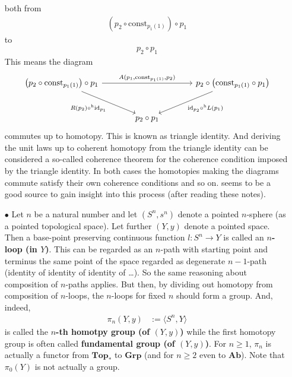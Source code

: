 \begin{enumerate}
both from
\begin{align*}
  \left(
    p_{2}
    \circ
    \mathrm{const}_{p_{1}(1)}
  \right)
  \circ
  p_{1}
\end{align*}
to
\begin{align*}
  p_{2}
  \circ
  p_{1}
\end{align*}
This means the diagram
\[
\begin{tikzcd}[sep=large]
  \left(
    p_{2}
    \circ
    \mathrm{const}_{p_{1}(1)}
  \right)
  \circ
  p_{1}
  \arrow{rr}{A(p_{1},\mathrm{const}_{p_{1}(1)},p_{2})}
  \arrow[swap]{dr}{R(p_{2}) \circ^{\textrm{h}} \mathrm{id}_{p_{1}}}
  &
  &
  p_{2}
  \circ
  \left(
    \mathrm{const}_{p_{1}(1)}
    \circ
    p_{1}
  \right)
  \arrow{dl}{\mathrm{id}_{p_{2}} \circ^{\textrm{h}} L(p_{1})}
  \\
  &
  p_{2}
  \circ
  p_{1}
  &
\end{tikzcd}
\]
commutes up to homotopy. This is known as triangle identity. And deriving the unit laws up to coherent homotopy from the triangle identity can be considered a so-called {\glqq}coherence theorem{\grqq} for the {\glqq}coherence condition{\grqq} imposed by the triangle identity. In both cases the homotopies making the diagrams {\glqq}commute{\grqq} satisfy their own coherence conditions and so on. \cite{69cbf29c} seems to be a good source to gain insight into this process (after reading these notes).
\item[$\bullet$]
Let $n$ be a natural number and let $(S^{n},s^{n})$ denote a pointed $n$-sphere (as a pointed topological space). Let further $(Y,y)$ denote a pointed space. Then a base-point preserving continuous function $l \colon S^{n} \rightarrow Y$ is called an \textbf{$n$-loop (in $Y$)}. This can be regarded as an $n$-path with starting point and terminus the same point of the space regarded as degenerate $n-1$-path (identity of identity of identity of \ldots). So the same reasoning about composition of $n$-paths applies. But then, by dividing out homotopy from composition of $n$-loops, the $n$-loops for fixed $n$ should form a group. And, indeed,
\begin{align*}
  \pi_{n}(Y,y)
  &:=
  \langle
    S^{n},
    Y
  \rangle
\end{align*}
is called the \textbf{$n$-th homotpy group (of $(Y,y)$)} while the first homotopy group is often called \textbf{fundamental group (of $(Y,y)$)}. For $n \geq 1$, $\pi_{n}$ is actually a functor from $\mathbf{Top}_{\ast}$ to $\mathbf{Grp}$ (and for $n \geq 2$ even to $\mathbf{Ab}$). Note that $\pi_{0}(Y)$ is not actually a group.

\end{enumerate}
